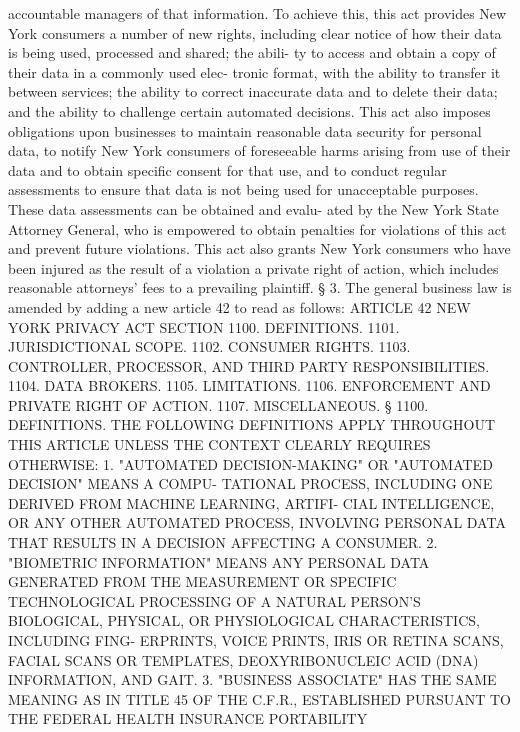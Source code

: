 accountable  managers  of  that  information.  To achieve this, this act
 provides New York consumers a number  of  new  rights,  including  clear
 notice of how their data is being used, processed and shared; the abili-
 ty  to  access  and obtain a copy of their data in a commonly used elec-
 tronic format, with the ability to transfer  it  between  services;  the
 ability  to  correct  inaccurate  data and to delete their data; and the
 ability to challenge certain automated decisions. This act also  imposes
 obligations  upon  businesses  to  maintain reasonable data security for
 personal data, to notify New York consumers of foreseeable harms arising
 from use of their data and to obtain specific consent for that use,  and
 to conduct regular assessments to ensure that data is not being used for
 unacceptable purposes. These data assessments can be obtained and evalu-
 ated  by the New York State Attorney General, who is empowered to obtain
 penalties for violations of this act and prevent future violations. This
 act also grants New York consumers who have been injured as  the  result
 of  a  violation  a  private  right of action, which includes reasonable
 attorneys' fees to a prevailing plaintiff.
   § 3. The general business law is amended by adding a new article 42 to
 read as follows:
                                ARTICLE 42
                           NEW YORK PRIVACY ACT
 SECTION 1100. DEFINITIONS.
         1101. JURISDICTIONAL SCOPE.
         1102. CONSUMER RIGHTS.
         1103. CONTROLLER, PROCESSOR, AND THIRD PARTY RESPONSIBILITIES.
         1104. DATA BROKERS.
         1105. LIMITATIONS.
         1106. ENFORCEMENT AND PRIVATE RIGHT OF ACTION.
         1107. MISCELLANEOUS.
   § 1100. DEFINITIONS. THE FOLLOWING DEFINITIONS APPLY  THROUGHOUT  THIS
 ARTICLE UNLESS THE CONTEXT CLEARLY REQUIRES OTHERWISE:
   1.  "AUTOMATED DECISION-MAKING" OR "AUTOMATED DECISION" MEANS A COMPU-
 TATIONAL PROCESS, INCLUDING ONE DERIVED FROM MACHINE  LEARNING,  ARTIFI-
 CIAL  INTELLIGENCE,  OR  ANY OTHER AUTOMATED PROCESS, INVOLVING PERSONAL
 DATA THAT RESULTS IN A DECISION AFFECTING A CONSUMER.
   2. "BIOMETRIC INFORMATION" MEANS ANY PERSONAL DATA GENERATED FROM  THE
 MEASUREMENT  OR  SPECIFIC TECHNOLOGICAL PROCESSING OF A NATURAL PERSON'S
 BIOLOGICAL, PHYSICAL, OR PHYSIOLOGICAL CHARACTERISTICS, INCLUDING  FING-
 ERPRINTS, VOICE PRINTS, IRIS OR RETINA SCANS, FACIAL SCANS OR TEMPLATES,
 DEOXYRIBONUCLEIC ACID (DNA) INFORMATION, AND GAIT.
   3.  "BUSINESS  ASSOCIATE"  HAS  THE SAME MEANING AS IN TITLE 45 OF THE
 C.F.R., ESTABLISHED PURSUANT TO THE FEDERAL HEALTH INSURANCE PORTABILITY
